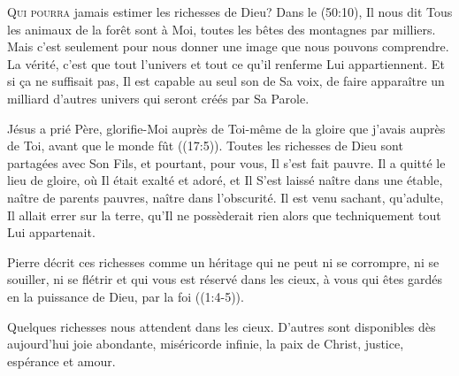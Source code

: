 

\lettrine{Q}{ui pourra} jamais estimer les richesses de Dieu?
 Dans le (50:10), Il nous dit\frcolon {}
 \Og Tous les animaux de la forêt sont à Moi,
 toutes les bêtes des montagnes par milliers. \Fg{}
 Mais c'est seulement pour nous donner une image que nous pouvons comprendre.
 La vérité, c'est que tout l'univers et tout ce qu'il renferme
 Lui appartiennent. Et si \c{c}a ne suffisait pas, Il est capable au seul son
 de Sa voix, de faire apparaître un milliard d'autres univers
 qui seront créés par Sa Parole.

Jésus a prié\frcolon {}
 \Og Père, glorifie-Moi auprès de Toi-même de la gloire
 que j'avais auprès de Toi, avant que le monde fût \Fg{}
 ((17:5)).
 Toutes les richesses de Dieu sont partagées avec Son Fils, et pourtant,
 pour vous, Il s'est fait pauvre. Il a quitté le lieu de gloire,
 où Il était exalté et adoré, et Il S'est laissé naître dans une étable,
 naître de parents pauvres, naître dans l'obscurité.
 Il est venu sachant, qu'adulte, Il allait errer sur la terre,
 qu'Il ne possèderait rien alors que techniquement tout Lui appartenait.


Pierre décrit ces richesses comme \Og un héritage qui ne peut ni se corrompre,
 ni se souiller, ni se flétrir et qui vous est réservé dans les cieux,
 à vous qui êtes gardés en la puissance de Dieu, par la foi \Fg{}
 ((1:4-5)). 

Quelques richesses nous attendent dans les cieux.
 D'autres sont disponibles dès aujourd'hui\frcolon
 joie abondante, miséricorde infinie, la paix de Christ,
 justice, espérance et amour.

\dvrule




